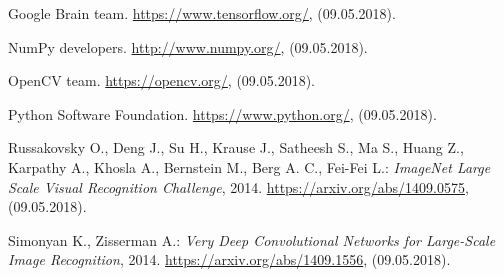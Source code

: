 \documentclass[a4paper]{article}
\begin{document}

\clearpage
\begin{thebibliography}{99}

 Google Brain team. \url{https://www.tensorflow.org/}, (09.05.2018).

 NumPy developers. \url{http://www.numpy.org/}, (09.05.2018).

 OpenCV team. \url{https://opencv.org/}, (09.05.2018).

 Python Software Foundation. \url{https://www.python.org/}, (09.05.2018).

Russakovsky O., Deng J., Su H., Krause J., Satheesh S., Ma S., Huang Z., Karpathy A., Khosla A., Bernstein M., Berg A. C., Fei-Fei L.: \textit{ImageNet Large Scale Visual Recognition Challenge}, 2014. 
\url{https://arxiv.org/abs/1409.0575}, (09.05.2018).

Simonyan K., Zisserman A.: \textit{Very Deep Convolutional Networks for Large-Scale Image Recognition}, 2014. \url{https://arxiv.org/abs/1409.1556}, (09.05.2018).

\end{thebibliography}
\end{document}
